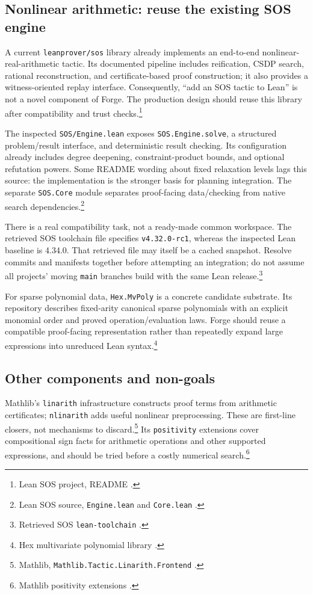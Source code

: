 \documentclass[11pt,a4paper]{article}
\newcommand{\code}[1]{\texttt{#1}}
\begin{document}
\subsection{Nonlinear arithmetic: reuse the existing SOS engine}
A current \code{leanprover/sos} library already implements an end-to-end
nonlinear-real-arithmetic tactic. Its documented pipeline includes reification,
CSDP search, rational reconstruction, and certificate-based proof construction;
it also provides a witness-oriented replay interface. Consequently, ``add an
SOS tactic to Lean'' is not a novel component of Forge. The production design
should reuse this library after compatibility and trust checks.\footnote{Lean
SOS project, README \cite{sos}.}

The inspected \code{SOS/Engine.lean} exposes \code{SOS.Engine.solve}, a structured
problem/result interface, and deterministic result checking. Its configuration
already includes degree deepening, constraint-product bounds, and optional
refutation powers. Some README wording about fixed relaxation levels lags this
source: the implementation is the stronger basis for planning integration.
The separate \code{SOS.Core} module separates proof-facing data/checking from
native search dependencies.\footnote{Lean SOS source, \code{Engine.lean} and
\code{Core.lean} \cite{sosengine,soscore}.}

There is a real compatibility task, not a ready-made common workspace. The
retrieved SOS toolchain file specifies \code{v4.32.0-rc1}, whereas the inspected
Lean baseline is 4.34.0. That retrieved file may itself be a cached snapshot.
Resolve commits and manifests together before attempting an integration; do
not assume all projects' moving \code{main} branches build with the same Lean
release.\footnote{Retrieved SOS \code{lean-toolchain} \cite{sostoolchain}.}

For sparse polynomial data, \code{Hex.MvPoly} is a concrete candidate substrate.
Its repository describes fixed-arity canonical sparse polynomials with an
explicit monomial order and proved operation/evaluation laws. Forge should
reuse a compatible proof-facing representation rather than repeatedly expand
large expressions into unreduced Lean syntax.\footnote{Hex multivariate
polynomial library \cite{hex}.}

\subsection{Other components and non-goals}
Mathlib's \code{linarith} infrastructure constructs proof terms from arithmetic
certificates; \code{nlinarith} adds useful nonlinear preprocessing. These are
first-line closers, not mechanisms to discard.\footnote{Mathlib,
\code{Mathlib.Tactic.Linarith.Frontend} \cite{linarith}.}
Its \code{positivity} extensions cover compositional sign facts for arithmetic
operations and other supported expressions, and should be tried before a
costly numerical search.\footnote{Mathlib positivity extensions \cite{positivity}.}
\end{document}
